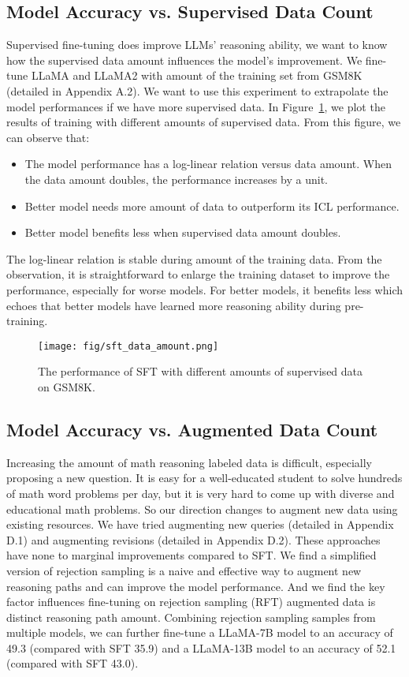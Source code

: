 \documentclass{article} \usepackage{iclr2021_conference,times}
\begin{document}
\subsection{Model Accuracy vs. Supervised Data Count}

Supervised fine-tuning does improve LLMs' reasoning ability, we want to know how the supervised data amount influences the model's improvement. 
We fine-tune LLaMA and LLaMA2 with  amount of the training set from GSM8K (detailed in Appendix A.2). We want to use this experiment to extrapolate the model performances if we have more supervised data. In Figure~\ref{fig:data_amount}, we plot the results of training with different amounts of supervised data. From this figure, we can observe that:
\begin{itemize}
    \item The model performance has a log-linear relation versus data amount. When the data amount doubles, the performance increases by a unit.
\item Better model needs more amount of data to outperform its ICL performance.
    \item Better model benefits less when supervised data amount doubles.
\end{itemize}
The log-linear relation is stable during  amount of the training data. From the observation, it is straightforward to enlarge the training dataset to improve the performance, especially for worse models.
For better models, it benefits less which echoes that better models have learned more reasoning ability during pre-training.



\begin{figure}[t]
    \centering
    \texttt{[image: fig/sft\_data\_amount.png]}
    \caption{The performance of SFT with different amounts of supervised data on GSM8K.}
    \label{fig:data_amount}
\end{figure}

\subsection{Model Accuracy vs. Augmented Data Count}
Increasing the amount of math reasoning labeled data is difficult, especially proposing a new question. 
It is easy for a well-educated student to solve hundreds of math word problems per day, but it is very hard to come up with diverse and educational math problems.
So our direction changes to augment new data using existing resources.
We have tried augmenting new queries (detailed in Appendix D.1) and augmenting revisions (detailed in Appendix D.2).
These approaches have none to marginal improvements compared to SFT.
We find a simplified version of rejection sampling \citep{zhu-etal-2023-solving} is a naive and effective way to augment new reasoning paths and can improve the model performance. 
And we find the key factor influences fine-tuning on rejection sampling (RFT) augmented data is distinct reasoning path amount.
Combining rejection sampling samples from multiple models, we can further fine-tune a LLaMA-7B model to an accuracy of 49.3 (compared with SFT 35.9) and a LLaMA-13B model to an accuracy of 52.1 (compared with SFT 43.0).
\end{document}
